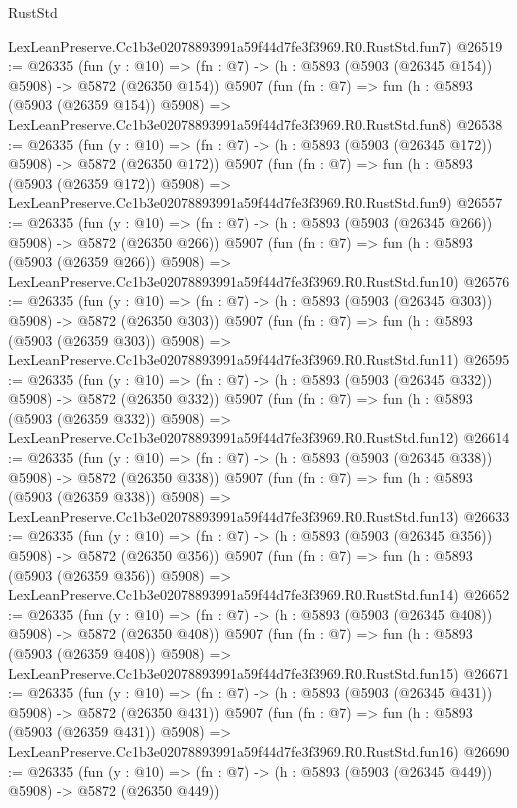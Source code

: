 \begin{lexlean}{RustStd}
\begin{coremodule}
    LexLeanPreserve.Cc1b3e02078893991a59f44d7fe3f3969.R0.RustStd.fun7)
@26519 := @26335
    (fun (y : @10) => (fn : @7) -> (h : @5893 (@5903 (@26345 @154)) @5908) -> @5872 (@26350 @154))
    @5907
    (fun (fn : @7) =>
    fun (h : @5893 (@5903 (@26359 @154)) @5908) =>
    LexLeanPreserve.Cc1b3e02078893991a59f44d7fe3f3969.R0.RustStd.fun8)
@26538 := @26335
    (fun (y : @10) => (fn : @7) -> (h : @5893 (@5903 (@26345 @172)) @5908) -> @5872 (@26350 @172))
    @5907
    (fun (fn : @7) =>
    fun (h : @5893 (@5903 (@26359 @172)) @5908) =>
    LexLeanPreserve.Cc1b3e02078893991a59f44d7fe3f3969.R0.RustStd.fun9)
@26557 := @26335
    (fun (y : @10) => (fn : @7) -> (h : @5893 (@5903 (@26345 @266)) @5908) -> @5872 (@26350 @266))
    @5907
    (fun (fn : @7) =>
    fun (h : @5893 (@5903 (@26359 @266)) @5908) =>
    LexLeanPreserve.Cc1b3e02078893991a59f44d7fe3f3969.R0.RustStd.fun10)
@26576 := @26335
    (fun (y : @10) => (fn : @7) -> (h : @5893 (@5903 (@26345 @303)) @5908) -> @5872 (@26350 @303))
    @5907
    (fun (fn : @7) =>
    fun (h : @5893 (@5903 (@26359 @303)) @5908) =>
    LexLeanPreserve.Cc1b3e02078893991a59f44d7fe3f3969.R0.RustStd.fun11)
@26595 := @26335
    (fun (y : @10) => (fn : @7) -> (h : @5893 (@5903 (@26345 @332)) @5908) -> @5872 (@26350 @332))
    @5907
    (fun (fn : @7) =>
    fun (h : @5893 (@5903 (@26359 @332)) @5908) =>
    LexLeanPreserve.Cc1b3e02078893991a59f44d7fe3f3969.R0.RustStd.fun12)
@26614 := @26335
    (fun (y : @10) => (fn : @7) -> (h : @5893 (@5903 (@26345 @338)) @5908) -> @5872 (@26350 @338))
    @5907
    (fun (fn : @7) =>
    fun (h : @5893 (@5903 (@26359 @338)) @5908) =>
    LexLeanPreserve.Cc1b3e02078893991a59f44d7fe3f3969.R0.RustStd.fun13)
@26633 := @26335
    (fun (y : @10) => (fn : @7) -> (h : @5893 (@5903 (@26345 @356)) @5908) -> @5872 (@26350 @356))
    @5907
    (fun (fn : @7) =>
    fun (h : @5893 (@5903 (@26359 @356)) @5908) =>
    LexLeanPreserve.Cc1b3e02078893991a59f44d7fe3f3969.R0.RustStd.fun14)
@26652 := @26335
    (fun (y : @10) => (fn : @7) -> (h : @5893 (@5903 (@26345 @408)) @5908) -> @5872 (@26350 @408))
    @5907
    (fun (fn : @7) =>
    fun (h : @5893 (@5903 (@26359 @408)) @5908) =>
    LexLeanPreserve.Cc1b3e02078893991a59f44d7fe3f3969.R0.RustStd.fun15)
@26671 := @26335
    (fun (y : @10) => (fn : @7) -> (h : @5893 (@5903 (@26345 @431)) @5908) -> @5872 (@26350 @431))
    @5907
    (fun (fn : @7) =>
    fun (h : @5893 (@5903 (@26359 @431)) @5908) =>
    LexLeanPreserve.Cc1b3e02078893991a59f44d7fe3f3969.R0.RustStd.fun16)
@26690 := @26335
    (fun (y : @10) => (fn : @7) -> (h : @5893 (@5903 (@26345 @449)) @5908) -> @5872 (@26350 @449))

\end{coremodule}
\end{lexlean}
